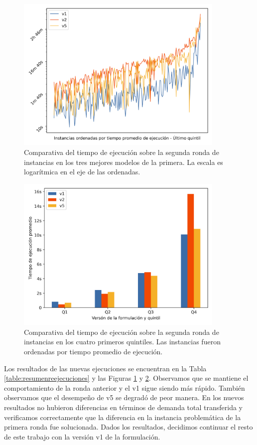 \documentclass{article}
\begin{document}
  \begin{figure}[h!]
    \centering
    \includegraphics[width=10cm]{../resources/run_time_comparsion_rerun.png}
    \caption{Comparativa del tiempo de ejecución sobre la segunda ronda de instancias en los tres mejores modelos de la primera. La escala es logarítmica en el eje de las ordenadas.} \label{fig:runtimecomparisonrerun}
  \end{figure}

  \begin{figure}[h!]
    \centering
    \includegraphics[width=10cm]{../resources/run_time_comparsion_by_quintile_rerun.png}
    \caption{Comparativa del tiempo de ejecución sobre la segunda ronda de instancias en los cuatro primeros quintiles. Las instancias fueron ordenadas por tiempo promedio de ejecución.} \label{fig:firstfourquintilesrerun}
  \end{figure}

  Los resultados de las nuevas ejecuciones se encuentran en la Tabla \ref{table:resumenreejecuciones} y las Figuras \ref{fig:runtimecomparisonrerun} y \ref{fig:firstfourquintilesrerun}. Observamos que se mantiene el comportamiento de la ronda anterior y el v1 sigue siendo más rápido. También observamos que el desempeño de v5 se degradó de peor manera. En los nuevos resultados no hubieron diferencias en términos de demanda total transferida y verificamos correctamente que la diferencia en la instancia problemática de la primera ronda fue solucionada. Dados los resultados, decidimos continuar el resto de este trabajo con la versión v1 de la formulación.
\end{document}
